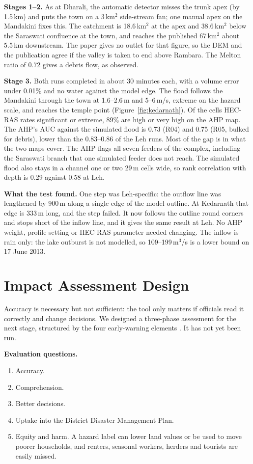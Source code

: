 \documentclass[sigconf,nonacm]{acmart}
\begin{document}
\textbf{Stages 1--2.} As at Dharali, the automatic detector misses the trunk apex (by 1.5\,km) and puts the town on a 3\,km$^2$ side-stream fan; one manual apex on the Mandakini fixes this. The catchment is 18.6\,km$^2$ at the apex and 38.6\,km$^2$ below the Saraswati confluence at the town, and reaches the published 67\,km$^2$ about 5.5\,km downstream. The paper gives no outlet for that figure, so the DEM and the publication agree if the valley is taken to end above Rambara. The Melton ratio of 0.72 gives a debris flow, as observed.

\textbf{Stage 3.} Both runs completed in about 30 minutes each, with a volume error under 0.01\% and no water against the model edge. The flood follows the Mandakini through the town at 1.6--2.6\,m and 5--6\,m/s, extreme on the hazard scale, and reaches the temple point (Figure~\ref{fig:kedarnath}). Of the cells HEC-RAS rates significant or extreme, 89\% are high or very high on the AHP map. The AHP's AUC against the simulated flood is 0.73 (R04) and 0.75 (R05, bulked for debris), lower than the 0.83--0.86 of the Leh runs. Most of the gap is in what the two maps cover. The AHP flags all seven feeders of the complex, including the Saraswati branch that one simulated feeder does not reach. The simulated flood also stays in a channel one or two 29\,m cells wide, so rank correlation with depth is 0.29 against 0.58 at Leh.

\textbf{What the test found.} One step was Leh-specific: the outflow line was lengthened by 900\,m along a single edge of the model outline. At Kedarnath that edge is 333\,m long, and the step failed. It now follows the outline round corners and stops short of the inflow line, and it gives the same result at Leh. No AHP weight, profile setting or HEC-RAS parameter needed changing. The inflow is rain only: the lake outburst is not modelled, so 109--199\,m$^3$/s is a lower bound on 17 June 2013.

\section{Impact Assessment Design}\label{sec:impact}
Accuracy is necessary but not sufficient: the tool only matters if officials read it correctly and change decisions. We designed a three-phase assessment for the next stage, structured by the four early-warning elements \cite{wmo2018}. It has not yet been run.

\textbf{Evaluation questions.}
\begin{enumerate}
  \item Accuracy.
  \item Comprehension.
  \item Better decisions.
  \item Uptake into the District Disaster Management Plan.
  \item Equity and harm. A hazard label can lower land values or be used to move poorer households, and renters, seasonal workers, herders and tourists are easily missed.
\end{enumerate}
\end{document}

